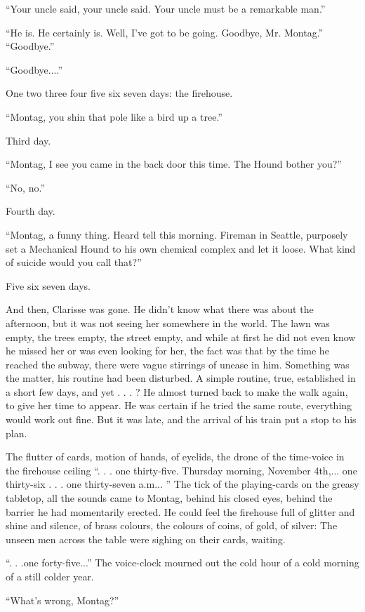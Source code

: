 \documentclass[11pt,openany]{book}
\begin{document}
``Your uncle said, your uncle said. Your uncle must be a remarkable man.''

``He is. He certainly is. Well, I've got to be going. Goodbye, Mr. Montag.'' ``Goodbye.''

``Goodbye....''

One two three four five six seven days: the firehouse.

``Montag, you shin that pole like a bird up a tree.''

Third day.

``Montag, I see you came in the back door this time. The Hound bother you?''

``No, no.''

Fourth day.

``Montag, a funny thing. Heard tell this morning. Fireman in Seattle, purposely set a Mechanical Hound to his own chemical complex and let it loose. What kind of suicide would you call that?''

Five six seven days.

And then, Clarisse was gone. He didn't know what there was about the afternoon, but it was not seeing her somewhere in the world. The lawn was empty, the trees empty, the street empty, and while at first he did not even know he missed her or was even looking for her, the fact was that by the time he reached the subway, there were vague stirrings of unease in him. Something was the matter, his routine had been disturbed. A simple routine, true, established in a short few days, and yet . . . ? He almost turned back to make the walk again, to give her time to appear. He was certain if he tried the same route, everything would work out fine. But it was late, and the arrival of his train put a stop to his plan.

The flutter of cards, motion of hands, of eyelids, the drone of the time-voice in the firehouse ceiling ``. . . one thirty-five. Thursday morning, November 4th,... one thirty-six . . . one thirty-seven a.m... '' The tick of the playing-cards on the greasy tabletop, all the sounds came to Montag, behind his closed eyes, behind the barrier he had momentarily erected. He could feel the firehouse full of glitter and shine and silence, of brass colours, the colours of coins, of gold, of silver: The unseen men across the table were sighing on their cards, waiting.

``. . .one forty-five...'' The voice-clock mourned out the cold hour of a cold morning of a still colder year.

``What's wrong, Montag?''
\end{document}
